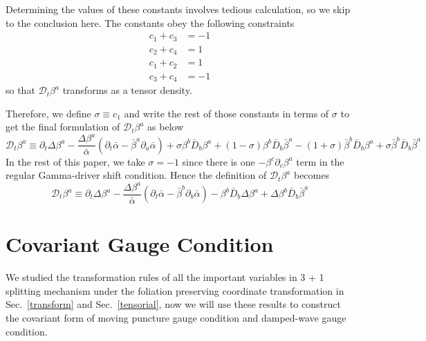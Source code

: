 \documentclass[letterpaper,nofootinbib,prd,amsmath,onecolumn]{revtex4-1}
\begin{document}
Determining the values of these constants involves tedious calculation, so we skip to the conclusion here. The constants obey the following constraints
\begin{align*}
c_{1} + c_{3} & = -1\\
c_{2} + c_{4} & = 1\\
c_{1} + c_{2} & = 1\\
c_{3} + c_{4} & = -1 
\end{align*}
so that $\mathscr{D}_{t} \beta^{a}$ transforms as a tensor density. 

Therefore, we define $\sigma \equiv c_{1}$ and write the rest of those constants in terms of $\sigma$ to get the final formulation of $\mathscr{D}_{t}\beta^{a}$ as below
\begin{equation}
\mathscr{D}_{t}\beta^{a} \equiv \partial_{t}\Delta \beta^{a} - \frac{\Delta \beta^{a}}{{\bar \alpha}}\left(\partial_{t}{\bar \alpha} - {\bar \beta}^{a}\partial_{a}{\bar \alpha}\right) + \sigma\beta^{b}{\bar D}_{b}\beta^{a} + \left(1-\sigma\right)\beta^{b}{\bar D}_{b}{\bar \beta}^{a} - \left(1 + \sigma\right){\bar \beta}^{b}{\bar D}_{b}\beta^{a} + \sigma{\bar \beta}^{b}{\bar D}_{b}{\bar \beta}^{a}
\end{equation}
In the rest of this paper, we take $\sigma = -1$ since there is one $-\beta^{c}\partial_{c}\beta^{a}$ term in the regular Gamma-driver shift condition. Hence the definition of $\mathscr{D}_{t}\beta^{a}$ becomes
\begin{equation}
\mathscr{D}_{t}\beta^{a} \equiv \partial_{t}\Delta \beta^{a} - \frac{\Delta \beta^{a}}{{\bar \alpha}}\left(\partial_{t}{\bar \alpha} - {\bar \beta}^{b}\partial_{b}{\bar \alpha}\right) - \beta^{b}{\bar D}_{b}\Delta \beta^{a} + \Delta \beta^{b}{\bar D}_{b}{\bar \beta}^{a}
\end{equation}

\section{Covariant Gauge Condition}\label{gauge}
We studied the transformation rules of all the important variables in 3 + 1 splitting mechanism under the foliation preserving coordinate transformation in Sec.~\ref{transform} and Sec.~\ref{tensorial}, now we will use these results to construct the covariant form of moving puncture gauge condition and damped-wave gauge condition. 
\end{document}
